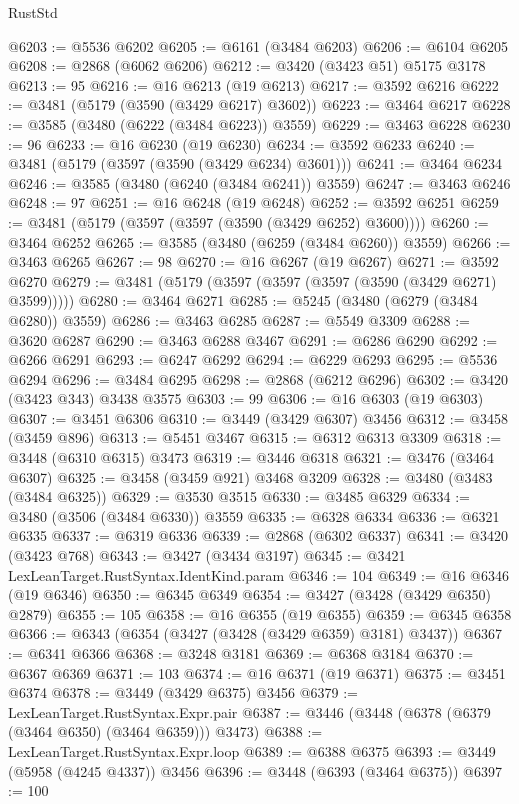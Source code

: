 \begin{lexlean}{RustStd}
\begin{coremodule}
{\begin{coremodule}
{{{{{{{{{{{{{{{{{{{{{{{{{{{{{{{{{{{{{{{{{{{{{{{{{{{{{{{{{{{{{{{{{{{{{{{{{{{{{{{{{{{{{@6203 := @5536 @6202
@6205 := @6161 (@3484 @6203)
@6206 := @6104 @6205
@6208 := @2868 (@6062 @6206)
@6212 := @3420 (@3423 @51) @5175 @3178
@6213 := 95
@6216 := @16 @6213 (@19 @6213)
@6217 := @3592 @6216
@6222 := @3481 (@5179 (@3590 (@3429 @6217) @3602))
@6223 := @3464 @6217
@6228 := @3585 (@3480 (@6222 (@3484 @6223)) @3559)
@6229 := @3463 @6228
@6230 := 96
@6233 := @16 @6230 (@19 @6230)
@6234 := @3592 @6233
@6240 := @3481 (@5179 (@3597 (@3590 (@3429 @6234) @3601)))
@6241 := @3464 @6234
@6246 := @3585 (@3480 (@6240 (@3484 @6241)) @3559)
@6247 := @3463 @6246
@6248 := 97
@6251 := @16 @6248 (@19 @6248)
@6252 := @3592 @6251
@6259 := @3481 (@5179 (@3597 (@3597 (@3590 (@3429 @6252) @3600))))
@6260 := @3464 @6252
@6265 := @3585 (@3480 (@6259 (@3484 @6260)) @3559)
@6266 := @3463 @6265
@6267 := 98
@6270 := @16 @6267 (@19 @6267)
@6271 := @3592 @6270
@6279 := @3481 (@5179 (@3597 (@3597 (@3597 (@3590 (@3429 @6271) @3599)))))
@6280 := @3464 @6271
@6285 := @5245 (@3480 (@6279 (@3484 @6280)) @3559)
@6286 := @3463 @6285
@6287 := @5549 @3309
@6288 := @3620 @6287
@6290 := @3463 @6288 @3467
@6291 := @6286 @6290
@6292 := @6266 @6291
@6293 := @6247 @6292
@6294 := @6229 @6293
@6295 := @5536 @6294
@6296 := @3484 @6295
@6298 := @2868 (@6212 @6296)
@6302 := @3420 (@3423 @343) @3438 @3575
@6303 := 99
@6306 := @16 @6303 (@19 @6303)
@6307 := @3451 @6306
@6310 := @3449 (@3429 @6307) @3456
@6312 := @3458 (@3459 @896)
@6313 := @5451 @3467
@6315 := @6312 @6313 @3309
@6318 := @3448 (@6310 @6315) @3473
@6319 := @3446 @6318
@6321 := @3476 (@3464 @6307)
@6325 := @3458 (@3459 @921) @3468 @3209
@6328 := @3480 (@3483 (@3484 @6325))
@6329 := @3530 @3515
@6330 := @3485 @6329
@6334 := @3480 (@3506 (@3484 @6330)) @3559
@6335 := @6328 @6334
@6336 := @6321 @6335
@6337 := @6319 @6336
@6339 := @2868 (@6302 @6337)
@6341 := @3420 (@3423 @768)
@6343 := @3427 (@3434 @3197)
@6345 := @3421 LexLeanTarget.RustSyntax.IdentKind.param
@6346 := 104
@6349 := @16 @6346 (@19 @6346)
@6350 := @6345 @6349
@6354 := @3427 (@3428 (@3429 @6350) @2879)
@6355 := 105
@6358 := @16 @6355 (@19 @6355)
@6359 := @6345 @6358
@6366 := @6343 (@6354 (@3427 (@3428 (@3429 @6359) @3181) @3437))
@6367 := @6341 @6366
@6368 := @3248 @3181
@6369 := @6368 @3184
@6370 := @6367 @6369
@6371 := 103
@6374 := @16 @6371 (@19 @6371)
@6375 := @3451 @6374
@6378 := @3449 (@3429 @6375) @3456
@6379 := LexLeanTarget.RustSyntax.Expr.pair
@6387 := @3446 (@3448 (@6378 (@6379 (@3464 @6350) (@3464 @6359))) @3473)
@6388 := LexLeanTarget.RustSyntax.Expr.loop
@6389 := @6388 @6375
@6393 := @3449 (@5958 (@4245 @4337)) @3456
@6396 := @3448 (@6393 (@3464 @6375))
@6397 := 100
}}}}}}}}}}}}}}}}}}}}}}}}}}}}}}}}}}}}}}}}}}}}}}}}}}}}}}}}}}}}}}}}}}}}}}}}}}}}}}}}}}}}}
\end{coremodule}}
\end{coremodule}
\end{lexlean}
